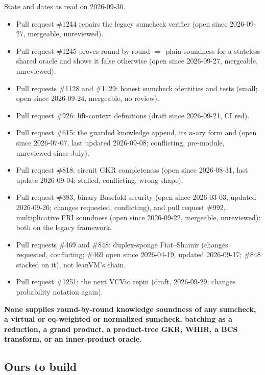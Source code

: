 State and dates as read on 2026-09-30.
\begin{itemize}
\item Pull request \#1244 repairs the legacy sumcheck verifier (open since 2026-09-27,
  mergeable, unreviewed).
\item Pull request \#1245 proves round-by-round $\Rightarrow$ plain soundness for a stateless
  shared oracle and shows it false otherwise (open since 2026-09-27, mergeable, unreviewed).
\item Pull requests \#1128 and \#1129: honest sumcheck identities and tests (small; open since
  2026-09-24, mergeable, no review).
\item Pull request \#926: lift-context definitions (draft since 2026-09-21, CI red).
\item Pull request \#615: the guarded knowledge append, its $n$-ary form and
   (open since 2026-07-07, last updated 2026-09-08; conflicting, pre-module,
  unreviewed since July).
\item Pull request \#818: circuit GKR completeness (open since 2026-08-31, last update
  2026-09-04; stalled, conflicting, wrong shape).
\item Pull request \#383, binary Basefold security (open since 2026-03-03, updated 2026-09-26;
  changes requested, conflicting), and pull request \#992, multiplicative FRI soundness (open
  since 2026-09-22, mergeable, unreviewed): both on the legacy framework.
\item Pull requests \#469 and \#848: duplex-sponge Fiat--Shamir (changes requested, conflicting;
  \#469 open since 2026-04-19, updated 2026-09-17; \#848 stacked on it), not leanVM's chain.
\item Pull request \#1251: the next VCVio repin (draft, 2026-09-29; changes probability notation
  again).
\end{itemize}
\textbf{None supplies round-by-round knowledge soundness of any sumcheck, a virtual or
eq-weighted or normalized sumcheck, batching as a reduction, a grand product, a product-tree
GKR, WHIR, a BCS transform, or an inner-product oracle.}

\subsection{Ours to build}\label{sec:ark-list-ours}

